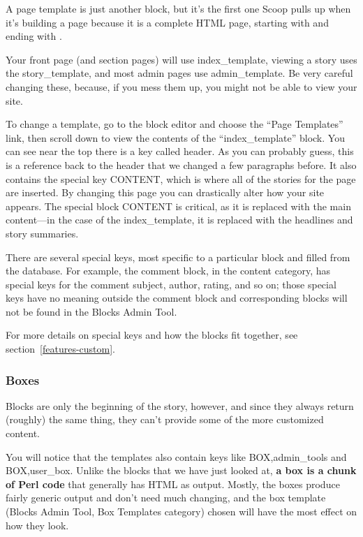 A page template is just another block, but it's the first one Scoop pulls up when it's building a page because it is a complete HTML page, starting with  and ending with .

Your front page (and section pages) will use index\_template, viewing a story uses the story\_template, and most admin pages use admin\_template.  Be very careful changing these, because, if you mess them up, you might not be able to view your site.

To change a template, go to the block editor and choose the ``Page Templates'' link, then scroll down to view the contents of the ``index\_template'' block.  You can see near the top there is a key called \latexhtml{$\vert$}{|}header\latexhtml{$\vert$}{|}.  As you can probably guess, this is a reference back to the header that we changed a few paragraphs before.  It also contains the special key \latexhtml{$\vert$}{|}CONTENT\latexhtml{$\vert$}{|}, which is where all of the stories for the page are inserted.  By changing this page you can drastically alter how your site appears.  The special block \latexhtml{$\vert$}{|}CONTENT\latexhtml{$\vert$}{|} is critical, as it is replaced with the main content---in the case of the index\_template, it is replaced with the headlines and story summaries.

There are several special keys, most specific to a particular block and filled from the database.  For example, the comment block, in the content category, has special keys for the comment subject, author, rating, and so on; those special keys have no meaning outside the comment block and corresponding blocks will not be found in the Blocks Admin Tool.

For more details on special keys and how the blocks fit together, see section~\ref{features-custom}.

\subsubsection{Boxes}
\label{how-boxes}

Blocks are only the beginning of the story, however, and since they always return (roughly) the same thing, they can't provide some of the more customized content.  

You will notice that the templates also contain keys like \latexhtml{$\vert$}{|}BOX,admin\_tools\latexhtml{$\vert$}{|} and \latexhtml{$\vert$}{|}BOX,user\_box\latexhtml{$\vert$}{|}.  Unlike the blocks that we have just looked at, {\bf a box is a chunk of Perl code} that generally has HTML as output.  Mostly, the boxes produce fairly generic output and don't need much changing, and the box template (Blocks Admin Tool, Box Templates category) chosen will have the most effect on how they look.


